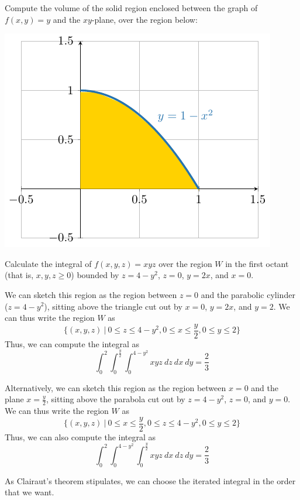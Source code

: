     \begin{example}
        Compute the volume of the solid region enclosed between the graph of  $f(x,y) = y$ and the $xy$-plane, over the region below:

        \begin{example}
    \begin{center}
            \includegraphics[scale=.7]{chapters/4-IntegrationRn/figures/figures-1-xsquaredregion.pdf}
    \end{center}
        \end{example}
        
    \end{example}

    \begin{example}
    Calculate the integral of $f(x,y,z) = xyz$ over the region $W$ in the first octant (that is, $x, y, z \geq 0$) bounded by $z = 4 - y^2$, $z = 0$, $y = 2x$, and $x= 0$.

    We can sketch this region as the region between $z=0$ and the parabolic cylinder ($z = 4 - y^2$), sitting above the triangle cut out by $x=0$, $y = 2x$, and $y=2$. We can thus write the region $W$ as 
    $$\{(x,y,z) \ | \ 0 \leq z \leq 4-y^2, 0 \leq x \leq \frac{y}{2}, 0 \leq y \leq 2\}$$
    Thus, we can compute the integral as $$\int_0^2\int_0^\frac{y}{2}\int_0^{4-y^2} xyz \ dz \ dx \ dy = \frac{2}{3}$$

    Alternatively, we can sketch this region as the region between $x=0$ and the plane $x = \frac{y}{2}$, sitting above the parabola cut out by $z = 4 - y^2$, $z=0$, and $y=0$.  We can thus write the region $W$ as 
    $$\{(x,y,z) \ | \ 0 \leq x \leq \frac{y}{2}, 0 \leq z \leq 4-y^2, 0 \leq y \leq 2\}$$
    Thus, we can also compute the integral as $$\int_0^2\int_0^{4-y^2}\int_0^\frac{y}{2} xyz \ dx \ dz \ dy = \frac{2}{3}$$

    As Clairaut's theorem stipulates, we can choose the iterated integral in the order that we want.
    \end{example}

